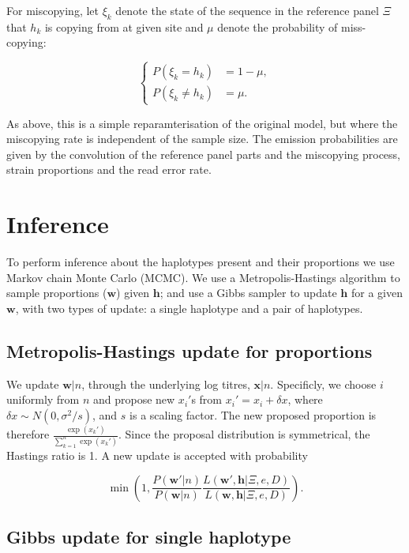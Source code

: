 \documentclass{nature}
\begin{document}
For miscopying, let $\xi_k$ denote the state of the sequence in the reference panel $\Xi$ that $h_k$ is copying from at given site and $\mu$ denote the probability of miss-copying:

$$
\begin{cases}
P(\xi_k = h_k) &= 1-\mu, \\
P(\xi_k \neq h_k) &= \mu.
\end{cases}
$$

\noindent As above, this is a simple reparamterisation of the original model, but where the miscopying rate is independent of the sample size. The emission probabilities are given by the convolution of the reference panel parts and the miscopying process, strain proportions and the read error rate.




\section*{Inference}

To perform inference about the haplotypes present and their proportions we use Markov chain Monte Carlo (MCMC). We use a Metropolis-Hastings algorithm to sample proportions ($\mathbf w$) given $\mathbf h$; and use a Gibbs sampler to update $\mathbf h$ for a given $\mathbf w$, with two types of update: a single haplotype and a pair of haplotypes.


\subsection*{Metropolis-Hastings update for proportions}\label{sec:updateP}

We update $\mathbf{w}|n$, through the underlying log titres, $\mathbf{x}|n$. Specificly, we choose $i$ uniformly from $n$ and propose new $x_i'$s from $x_i' = x_i + \delta x$, where $\delta x \sim N(0, \sigma^2/s)$, and $s$ is a scaling factor. The new proposed proportion is therefore $\frac{\exp(x_k')}{\sum_{k=1}^n \exp(x_k')}$. Since the proposal distribution is symmetrical, the Hastings ratio is 1. A new update is accepted with probability

 $$\min\left(1, \frac{P(\mathbf{w}'|n)}{P(\mathbf{w}|n)} \frac{L(\mathbf{w}', \mathbf{h} | \Xi, e, D)}{L(\mathbf{w}, \mathbf{h} | \Xi, e, D)}\right).$$



\subsection*{Gibbs update for single haplotype}
\end{document}
